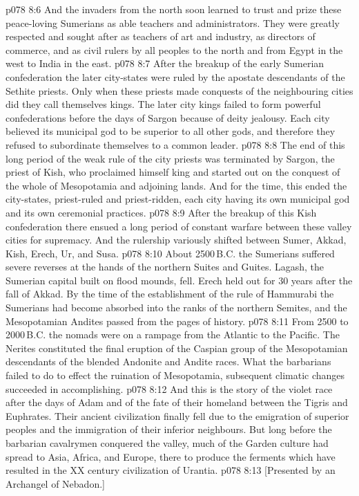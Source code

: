 \vs p078 8:6 And the invaders from the north soon learned to trust and prize these peace\hyp{}loving Sumerians as able teachers and administrators. They were greatly respected and sought after as teachers of art and industry, as directors of commerce, and as civil rulers by all peoples to the north and from Egypt in the west to India in the east.
\vs p078 8:7 After the breakup of the early Sumerian confederation the later city\hyp{}states were ruled by the apostate descendants of the Sethite priests. Only when these priests made conquests of the neighbouring cities did they call themselves kings. The later city kings failed to form powerful confederations before the days of Sargon because of deity jealousy. Each city believed its municipal god to be superior to all other gods, and therefore they refused to subordinate themselves to a common leader.
\vs p078 8:8 The end of this long period of the weak rule of the city priests was terminated by Sargon, the priest of Kish, who proclaimed himself king and started out on the conquest of the whole of Mesopotamia and adjoining lands. And for the time, this ended the city\hyp{}states, priest\hyp{}ruled and priest\hyp{}ridden, each city having its own municipal god and its own ceremonial practices.
\vs p078 8:9 After the breakup of this Kish confederation there ensued a long period of constant warfare between these valley cities for supremacy. And the rulership variously shifted between Sumer, Akkad, Kish, Erech, Ur, and Susa.
\vs p078 8:10 About 2500\,B.C. the Sumerians suffered severe reverses at the hands of the northern Suites and Guites. Lagash, the Sumerian capital built on flood mounds, fell. Erech held out for 30 years after the fall of Akkad. By the time of the establishment of the rule of Hammurabi the Sumerians had become absorbed into the ranks of the northern Semites, and the Mesopotamian Andites passed from the pages of history.
\vs p078 8:11 From 2500 to 2000\,B.C. the nomads were on a rampage from the Atlantic to the Pacific. The Nerites constituted the final eruption of the Caspian group of the Mesopotamian descendants of the blended Andonite and Andite races. What the barbarians failed to do to effect the ruination of Mesopotamia, subsequent climatic changes succeeded in accomplishing.
\vs p078 8:12 \pc And this is the story of the violet race after the days of Adam and of the fate of their homeland between the Tigris and Euphrates. Their ancient civilization finally fell due to the emigration of superior peoples and the immigration of their inferior neighbours. But long before the barbarian cavalrymen conquered the valley, much of the Garden culture had spread to Asia, Africa, and Europe, there to produce the ferments which have resulted in the XX century civilization of Urantia.
\vsetoff
\vs p078 8:13 [Presented by an Archangel of Nebadon.]
\quizlink
